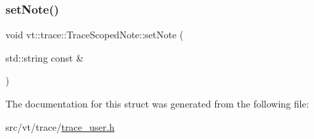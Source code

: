 \subsubsection{\texorpdfstring{set\+Note()}{setNote()}}
{\footnotesize\ttfamily void vt\+::trace\+::\+Trace\+Scoped\+Note\+::set\+Note (\begin{DoxyParamCaption}\item[{std\+::string const \&}]{ }\end{DoxyParamCaption})\hspace{0.3cm}{\ttfamily [inline]}}



The documentation for this struct was generated from the following file\+:\begin{DoxyCompactItemize}
\item 
src/vt/trace/\hyperlink{trace__user_8h}{trace\+\_\+user.\+h}\end{DoxyCompactItemize}
